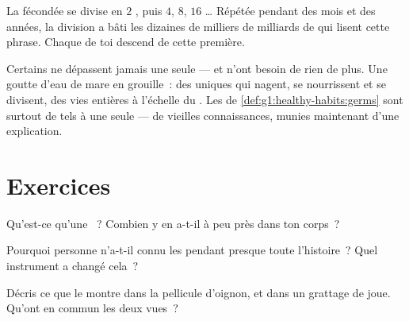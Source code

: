 \begin{example}\label{ex:g5:first-look-at-cells:one}
La  fécondée se divise en $2$ , puis $4$, $8$,
$16$ \dots{} Répétée pendant des mois et des années, la division a
bâti les dizaines de milliers de milliards de  qui lisent
cette phrase. Chaque  de toi descend de cette première.
\end{example}

\begin{remark}\label{rem:g5:first-look-at-cells:onecelled}
Certains  ne dépassent jamais une seule  --- et
n'ont besoin de rien de plus. Une goutte d'eau de mare en grouille~:
des  uniques qui nagent, se nourrissent et se divisent, des
vies entières à l'échelle du . Les  de
\cref{def:g1:healthy-habits:germs} sont surtout de tels  à une seule  --- de vieilles connaissances, munies
maintenant d'une explication.
\end{remark}

\section{Exercices}

\begin{exercise}[$\star$]\label{exo:g5:first-look-at-cells:1}
Qu'est-ce qu'une ~? Combien y en a-t-il à peu près dans ton
corps~?
\end{exercise}

\begin{exercise}[$\star$]\label{exo:g5:first-look-at-cells:2}
Pourquoi personne n'a-t-il connu les  pendant presque toute
l'histoire~? Quel instrument a changé cela~?
\end{exercise}

\begin{exercise}[$\star$]\label{exo:g5:first-look-at-cells:3}
Décris ce que le  montre dans la pellicule d'oignon, et
dans un grattage de joue. Qu'ont en commun les deux vues~?
\end{exercise}

